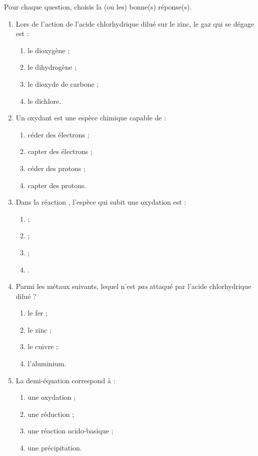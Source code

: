 \documentclass[11pt]{article}
\begin{document}
\begin{exercice}
Pour chaque question, choisis la (ou les) bonne(s) réponse(s).
\begin{enumerate}
\item Lors de l'action de l'acide chlorhydrique dilué sur le zinc, le gaz qui se dégage est :
\begin{enumerate}
\item le dioxygène ; \item le dihydrogène ; \item le dioxyde de carbone ; \item le dichlore.
\end{enumerate}
\item Un oxydant est une espèce chimique capable de :
\begin{enumerate}
\item céder des électrons ; \item capter des électrons ; \item céder des protons ; \item capter des protons.
\end{enumerate}
\item Dans la réaction , l'espèce qui subit une oxydation est :
\begin{enumerate}
\item {} ; \item {} ; \item {} ; \item {}.
\end{enumerate}
\item Parmi les métaux suivants, lequel n'est \emph{pas} attaqué par l'acide chlorhydrique dilué ?
\begin{enumerate}
\item le fer ; \item le zinc ; \item le cuivre ; \item l'aluminium.
\end{enumerate}
\item La demi-équation  correspond à :
\begin{enumerate}
\item une oxydation ; \item une réduction ; \item une réaction acido-basique ; \item une précipitation.
\end{enumerate}
\end{enumerate}
\end{exercice}
\end{document}
